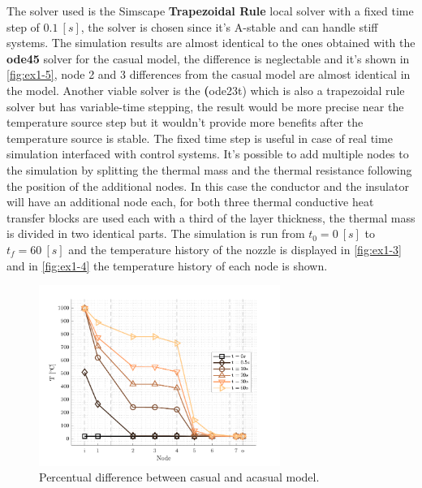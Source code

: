 \documentclass[11pt,a4paper,oneside]{article}
\begin{document}
The solver used is the Simscape \textbf{Trapezoidal Rule} local solver with a fixed time step of $0.1\ [s]$, the solver is chosen
since it's A-stable and can handle stiff systems. The simulation results are almost identical to the ones
obtained with the \textbf{ode45} solver for the casual model, the difference is neglectable and it's shown in 
\autoref{fig:ex1-5}, node 2 and 3 differences from the casual model are almost identical in the model. 
Another viable solver is the \textbf(ode23t) which is also a trapezoidal rule solver but has variable-time stepping,
the result would be more precise near the temperature source step but it wouldn't provide more benefits after the
temperature source is stable. The fixed time step is useful in case of real time simulation interfaced
with control systems. 
It's possible to add multiple nodes to the simulation by splitting the thermal mass and the thermal resistance 
following the position of the additional nodes. In this case the conductor and the insulator will have an additional node each,
for both three thermal conductive heat transfer blocks are used each with a third of the layer thickness, 
the thermal mass is divided in two identical parts. The simulation is run from $t_0=0\ [s]$ to $t_f=60\ [s]$ 
and the temperature history of the nozzle is displayed in \autoref{fig:ex1-3} and in \autoref{fig:ex1-4} the 
temperature history of each node is shown.

\begin{figure}[h!]
    \centering
        \includegraphics[width = 0.7\textwidth]{gfx/ex1-3.pdf}
        \caption{Percentual difference between casual and acasual model.}\label{fig:ex1-3}
\end{figure}
\end{document}
